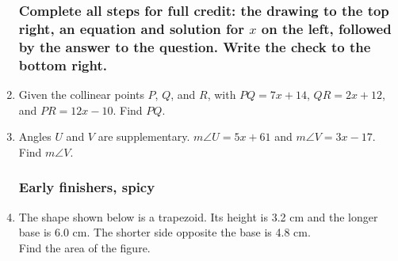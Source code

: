 \documentclass[12pt, twoside]{article}
\begin{document}
\begin{enumerate}
\newpage

\subsubsection*{Complete all steps for full credit: the drawing to the top right, an equation and solution for $x$ on the left, followed by the answer to the question. Write the check to the bottom right.}

\item Given the collinear points $P$, $Q$, and $R$, with $PQ=7x+14$, $QR=2x+12$, and $PR=12x-10$. Find ${PQ}$.
  \vspace{9cm}

\item Angles $U$ and $V$ are supplementary. $m\angle U = 5x+61$ and $m\angle V = 3x-17$. Find $m\angle V$. \vspace{7cm}


\newpage
\subsubsection*{Early finishers, spicy}

\item The shape shown below is a trapezoid. Its height is 3.2 cm and the longer base is 6.0 cm. The shorter side opposite the base is 4.8 cm. \\[0.25cm]
  Find the area of the figure.
  \begin{flushright} 
  \end{flushright} 
  \vspace{4cm}



\end{enumerate}
\end{document}

